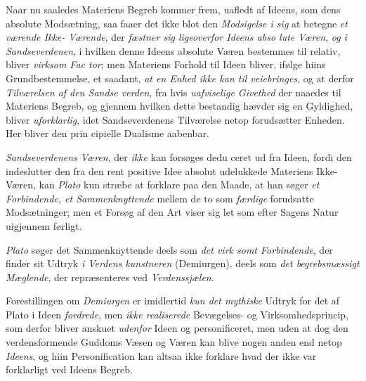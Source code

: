 Naar nu saaledes Materiens Begreb kommer frem, uafledt
af Ideens, som dens absolute Modsætning, saa faaer det ikke
blot den \emph{Modsigelse i sig} at betegne \emph{et værende Ikke-%
Værende}, der \emph{fæstner sig ligeoverfor Ideens abso\-%
lute Væren}, \emph{og i Sandseverdenen}, i hvilken denne Ideens
absolute Væren bestemmes til relativ, bliver \emph{virksom Fac\-%
tor}; men Materiens Forhold til Ideen bliver, ifølge hiins
Grundbestemmelse, et saadant, \emph{at en Enhed ikke kan til\-%
veiebringes}, og at derfor \emph{Tilværelsen af den Sandse\-%
verden}, fra hvis \emph{uafviselige Givethed} der naaedes til
Materiens Begreb, og gjennem hvilken dette bestandig hævder
sig en Gyldighed, bliver \emph{uforklarlig}, idet Sandseverdenens
Tilværelse netop forudsætter Enheden. Her bliver den prin\-%
cipielle Dualisme aabenbar.

\emph{Sandseverdenens Væren}, der \emph{ikke} kan forsøges dedu\-%
ceret ud fra Ideen, fordi den indeslutter den fra den rent
positive Idee absolut udelukkede Materiens Ikke-Væren, kan
\emph{Plato} kun stræbe at forklare paa den Maade, at han søger
\emph{et Forbindende, et Sammenknyttende} mellem de to
som \emph{færdige} forudsatte Modsætninger; men et Forsøg af
den Art viser sig let som efter Sagens Natur uigjennem\-%
førligt.

\emph{Plato} søger det Sammenknyttende deels som \emph{det virk\-%
somt Forbindende}, der finder sit Udtryk \emph{i Verdens\-%
kunstneren} (Demiurgen), deels som \emph{det begrebsmæssigt
Mæglende}, der repræsenteres ved \emph{Verdenssjælen}.

Forestillingen om \emph{Demiurgen} er imidlertid \emph{kun det
mythiske} Udtryk for det af Plato i Ideen \emph{fordrede}, men
\emph{ikke realiserede} Bevægelses- og Virksomhedsprincip, som
\setcounter{footnote}{0}
derfor bliver anskuet \emph{udenfor} Ideen og personificeret,
men uden at dog den verdensformende Guddoms Væsen og
Væren kan blive nogen anden end netop \emph{Ideens}, og hiin
Personification kan altsaa ikke forklare hvad der ikke var
forklarligt ved Ideens Begreb.

